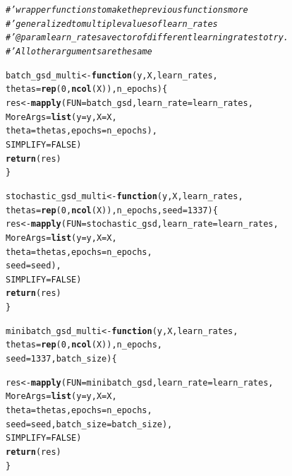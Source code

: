 \documentclass[11pt, a4paper, english]{article}\usepackage[]{graphicx}\usepackage[dvipsnames]{xcolor}
\makeatletter
\newcommand{\hlnum}[1]{\textcolor[rgb]{0.686,0.059,0.569}{#1}}%
\newcommand{\hlcom}[1]{\textcolor[rgb]{0.678,0.584,0.686}{\textit{#1}}}%
\newcommand{\hlstd}[1]{\textcolor[rgb]{0.345,0.345,0.345}{#1}}%
\newcommand{\hlkwa}[1]{\textcolor[rgb]{0.161,0.373,0.58}{\textbf{#1}}}%
\newcommand{\hlkwb}[1]{\textcolor[rgb]{0.69,0.353,0.396}{#1}}%
\newcommand{\hlkwc}[1]{\textcolor[rgb]{0.333,0.667,0.333}{#1}}%
\newcommand{\hlkwd}[1]{\textcolor[rgb]{0.737,0.353,0.396}{\textbf{#1}}}%
\newenvironment{kframe}{%
 \def\at@end@of@kframe{}%
 \ifinner\ifhmode%
  \def\at@end@of@kframe{\end{minipage}}%
  \begin{minipage}{\columnwidth}%
 \fi\fi%
 \def\FrameCommand##1{\hskip\@totalleftmargin \hskip-\fboxsep
 \colorbox{shadecolor}{##1}\hskip-\fboxsep
     \hskip-\linewidth \hskip-\@totalleftmargin \hskip\columnwidth}%
 \MakeFramed {\advance\hsize-\width
   \@totalleftmargin\z@ \linewidth\hsize
   \@setminipage}}%
 {\par\unskip\endMakeFramed%
 \at@end@of@kframe}
\newenvironment{knitrout}{}{} %
\makeatother
\begin{document}
\begin{knitrout}
\color{fgcolor}\begin{kframe}
\begin{alltt}
\hlcom{#' wrapper functions to make the previous functions more}
\hlcom{#'  generalized to multiple values of learn_rates}
\hlcom{#' @param learn_rates a vector of different learning rates to try. }
\hlcom{#' All other arguments are the same}

\hlstd{batch_gsd_multi} \hlkwb{<-} \hlkwa{function}\hlstd{(}\hlkwc{y}\hlstd{,} \hlkwc{X}\hlstd{,} \hlkwc{learn_rates}\hlstd{,}
                            \hlkwc{thetas} \hlstd{=} \hlkwd{rep}\hlstd{(}\hlnum{0}\hlstd{,} \hlkwd{ncol}\hlstd{(X)),} \hlkwc{n_epochs}\hlstd{)\{}
  \hlstd{res} \hlkwb{<-} \hlkwd{mapply}\hlstd{(}\hlkwc{FUN} \hlstd{= batch_gsd,} \hlkwc{learn_rate}\hlstd{=learn_rates,}
                \hlkwc{MoreArgs} \hlstd{=} \hlkwd{list}\hlstd{(}\hlkwc{y}\hlstd{=y,} \hlkwc{X}\hlstd{=X,}
                                \hlkwc{theta} \hlstd{= thetas,} \hlkwc{epochs} \hlstd{= n_epochs),}
                \hlkwc{SIMPLIFY} \hlstd{=} \hlnum{FALSE}\hlstd{)}
\hlkwd{return}\hlstd{(res)}
\hlstd{\}}

\hlstd{stochastic_gsd_multi} \hlkwb{<-} \hlkwa{function}\hlstd{(}\hlkwc{y}\hlstd{,} \hlkwc{X}\hlstd{,} \hlkwc{learn_rates}\hlstd{,}
                                 \hlkwc{thetas} \hlstd{=} \hlkwd{rep}\hlstd{(}\hlnum{0}\hlstd{,} \hlkwd{ncol}\hlstd{(X)),} \hlkwc{n_epochs}\hlstd{,} \hlkwc{seed}\hlstd{=}\hlnum{1337}\hlstd{)\{}
  \hlstd{res} \hlkwb{<-} \hlkwd{mapply}\hlstd{(}\hlkwc{FUN} \hlstd{= stochastic_gsd,} \hlkwc{learn_rate}\hlstd{=learn_rates,}
                \hlkwc{MoreArgs} \hlstd{=} \hlkwd{list}\hlstd{(}\hlkwc{y}\hlstd{=y,} \hlkwc{X}\hlstd{=X,}
                                \hlkwc{theta} \hlstd{= thetas,} \hlkwc{epochs} \hlstd{= n_epochs,}
                                \hlkwc{seed}\hlstd{=seed),}
                \hlkwc{SIMPLIFY} \hlstd{=} \hlnum{FALSE}\hlstd{)}
  \hlkwd{return}\hlstd{(res)}
\hlstd{\}}

\hlstd{minibatch_gsd_multi} \hlkwb{<-} \hlkwa{function}\hlstd{(}\hlkwc{y}\hlstd{,} \hlkwc{X}\hlstd{,} \hlkwc{learn_rates}\hlstd{,}
                                 \hlkwc{thetas} \hlstd{=} \hlkwd{rep}\hlstd{(}\hlnum{0}\hlstd{,} \hlkwd{ncol}\hlstd{(X)),} \hlkwc{n_epochs}\hlstd{,}
                                \hlkwc{seed}\hlstd{=}\hlnum{1337}\hlstd{,} \hlkwc{batch_size}\hlstd{) \{}

  \hlstd{res} \hlkwb{<-} \hlkwd{mapply}\hlstd{(}\hlkwc{FUN} \hlstd{= minibatch_gsd,} \hlkwc{learn_rate}\hlstd{=learn_rates,}
                \hlkwc{MoreArgs} \hlstd{=} \hlkwd{list}\hlstd{(}\hlkwc{y}\hlstd{=y,} \hlkwc{X}\hlstd{=X,}
                                \hlkwc{theta} \hlstd{= thetas,} \hlkwc{epochs} \hlstd{= n_epochs,}
                                \hlkwc{seed}\hlstd{=seed,} \hlkwc{batch_size} \hlstd{= batch_size),}
                \hlkwc{SIMPLIFY} \hlstd{=} \hlnum{FALSE}\hlstd{)}
  \hlkwd{return}\hlstd{(res)}
  \hlstd{\}}



\end{alltt}
\end{kframe}
\end{knitrout}
\end{document}
